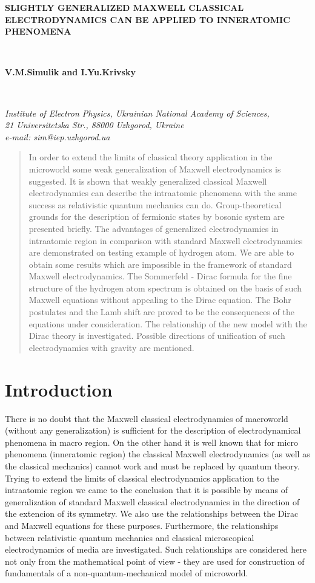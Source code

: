 \documentclass[a4paper,12pt]{article}
\begin{document}
\begin{center}
\textbf{SLIGHTLY GENERALIZED MAXWELL CLASSICAL ELECTRODYNAMICS
CAN BE APPLIED TO INNERATOMIC PHENOMENA}

\bigskip\

\textbf{V.M.Simulik and I.Yu.Krivsky}

\smallskip\

\textit{Institute of Electron Physics, Ukrainian National Academy
of Sciences,\\21 Universitetska Str., 88000 Uzhgorod,
Ukraine\\e-mail: sim@iep.uzhgorod.ua}
\end{center}

\begin{abstract}
In order to extend the limits of classical theory application in the
microworld some weak generalization of Maxwell electrodynamics is suggested.
It is shown that weakly generalized classical Maxwell electrodynamics can
describe the intraatomic phenomena with the same success as relativistic
quantum mechanics can do. Group-theoretical grounds for the description of
fermionic states by bosonic system are presented briefly. The advantages of
generalized electrodynamics in intraatomic region in comparison with
standard Maxwell electrodynamics are demonstrated on testing example of
hydrogen atom. We are able to obtain some results which are impossible in
the framework of standard Maxwell electrodynamics. The Sommerfeld - Dirac
formula for the fine structure of the hydrogen atom spectrum is obtained on
the basis of such Maxwell equations without appealing to the Dirac equation.
The Bohr postulates and the Lamb shift are proved to be the consequences of
the equations under consideration. The relationship of the new model with
the Dirac theory is investigated. Possible directions of unification of such
electrodynamics with gravity are mentioned.
\end{abstract}

\section{Introduction}

There is no doubt that the Maxwell classical electrodynamics of macroworld
(without any generalization) is sufficient for the description of
electrodynamical phenomena in macro region. On the other hand it is well
known that for micro phenomena (inneratomic region) the classical Maxwell
electrodynamics (as well as the classical mechanics) cannot work and must be
replaced by quantum theory. Trying to extend the limits of classical
electrodynamics application to the intraatomic region we came to the
conclusion that it is possible by means of generalization of standard
Maxwell classical electrodynamics in the direction of the extencion of its
symmetry. We also use the relationships between the Dirac and Maxwell
equations for these purposes. Furthermore, the relationships between
relativistic quantum mechanics and classical microscopical electrodynamics
of media are investigated. Such relationships are considered here not only
from the mathematical point of view - they are used for construction of
fundamentals of a non-quantum-mechanical model of microworld.
\end{document}
